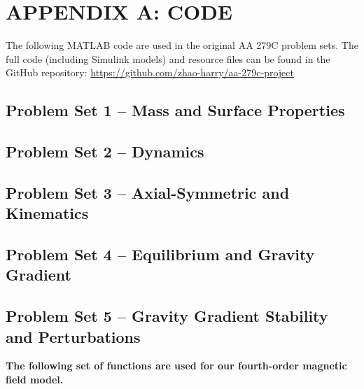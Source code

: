 \appendix

\section{APPENDIX A: CODE}
The following MATLAB code are used in the original AA 279C problem sets. The full code (including Simulink models) and resource files can be found in the GitHub repository: \url{https://github.com/zhao-harry/aa-279c-project}

\subsection{Problem Set 1 – Mass and Surface Properties}


\newpage
\subsection{Problem Set 2 – Dynamics}








\newpage
\subsection{Problem Set 3 – Axial-Symmetric and Kinematics}



\newpage
\subsection{Problem Set 4 – Equilibrium and Gravity Gradient}



\newpage
\subsection{Problem Set 5 – Gravity Gradient Stability and Perturbations}





\newpage
\textbf{The following set of functions are used for our fourth-order magnetic field model.}






